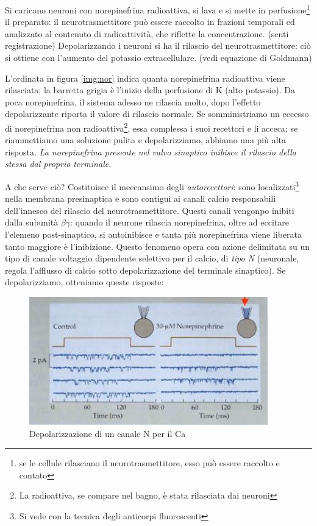 \documentclass[a4paper,12pt]{article}
\begin{document}
Si caricano neuroni con norepinefrina radioattiva, si lava e si mette in perfusione\footnote{se le cellule rilasciano il neurotrasmettitore, esso può essere raccolto e contato} il preparato: il neurotrasmettitore può essere raccolto in frazioni temporali ed analizzato al contenuto di radioattività, che riflette la concentrazione. (senti registrazione)
Depolarizzando i neuroni si ha il rilascio del neurotrasmettitore: ciò si ottiene con l'aumento del potassio extracellulare. (vedi equazione di Goldmann)

L'ordinata in figura \ref{img:nor} indica quanta norepinefrina radioattiva viene rilasciata; la barretta grigia è l'inizio della perfusione di K (alto potassio). Da poca norepinefrina, il sistema adesso ne rilascia molto, dopo l'effetto depolarizzante riporta il valore di rilascio normale. Se somministriamo un eccesso di norepinefrina non radioattiva\footnote{La radioattiva, se compare nel bagno, è stata rilasciata dai neuroni}, essa complessa i suoi recettori e li acceca; se riammettiamo una soluzione pulita e depolarizziamo, abbiamo una più alta risposta.
\emph{La norepinefrina presente nel valvo sinaptico inibisce il rilascio della stessa dal proprio terminale}.

A che serve ciò? Costituisce il meccansimo degli \emph{autorecettori}: sono localizzati\footnote{Si vede con la tecnica degli anticorpi fluorescenti} nella membrana presinaptica e sono contigui ai canali calcio responsabili dell'innesco del rilascio del neurotrasmettitore. Questi canali vengonpo inibiti dalla subunità $\beta \gamma$: quando il neurone rilascia norepinefrina, oltre ad eccitare l'elemeno post-sinaptico, si autoinibisce e tanta più norepinefrina viene liberata tanto maggiore è l'inibizione.
Questo fenomeno opera con azione delimitata su un tipo di canale voltaggio dipendente selettivo per il calcio, di \emph{tipo N} (neuronale, regola l'afflusso di calcio sotto depolarizzazione del terminale sinaptico). Se depolarizziamo, otteniamo queste risposte:
\begin{figure}[H]
\centering
\includegraphics[scale=0.5]{immagine/canaliN.jpg}
\caption{Depolarizzazione di un canale N per il Ca}
\label{img:can}
\end{figure} 
\end{document}
